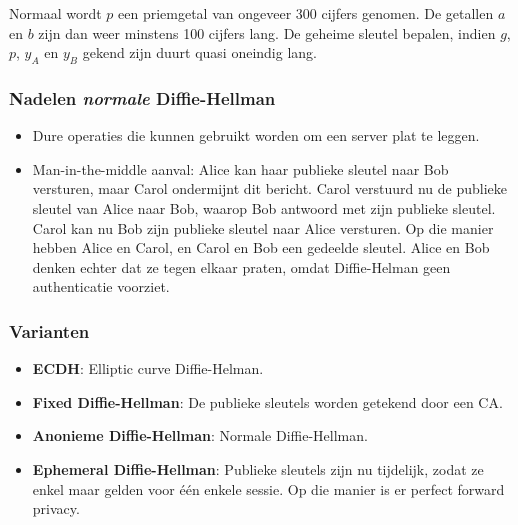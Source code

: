 \documentclass{report}
\begin{document}
	 Normaal wordt $p$ een priemgetal van ongeveer 300 cijfers genomen. De getallen $a$ en $b$ zijn dan weer minstens 100 cijfers lang. De geheime sleutel bepalen, indien $g$, $p$, $y_A$ en $y_B$ gekend zijn duurt quasi oneindig lang. 

	\subsubsection{Nadelen \emph{normale} Diffie-Hellman}
	\begin{itemize}
		\item[\alert] Dure operaties die kunnen gebruikt worden om een server plat te leggen.
		\item[\alert] Man-in-the-middle aanval: Alice kan haar publieke sleutel naar Bob versturen, maar Carol ondermijnt dit bericht. Carol verstuurd nu de publieke sleutel van Alice naar Bob, waarop Bob antwoord met zijn publieke sleutel. Carol kan nu Bob zijn publieke sleutel naar Alice versturen. Op die manier hebben Alice en Carol, en Carol en Bob een gedeelde sleutel. Alice en Bob denken echter dat ze tegen elkaar praten, omdat Diffie-Helman geen authenticatie voorziet.
	\end{itemize}
	\subsubsection{Varianten}
	\begin{itemize}
		\item[\info] \textbf{ECDH}: Elliptic curve Diffie-Helman.
		\item[\info] \textbf{Fixed Diffie-Hellman}: De publieke sleutels worden getekend door een CA.
		\item[\info] \textbf{Anonieme Diffie-Hellman}: Normale Diffie-Hellman.
		\item[\info] \textbf{Ephemeral Diffie-Hellman}: Publieke sleutels zijn nu tijdelijk, zodat ze enkel maar gelden voor één enkele sessie. Op die manier is er perfect forward privacy. 
	\end{itemize}
\end{document}
